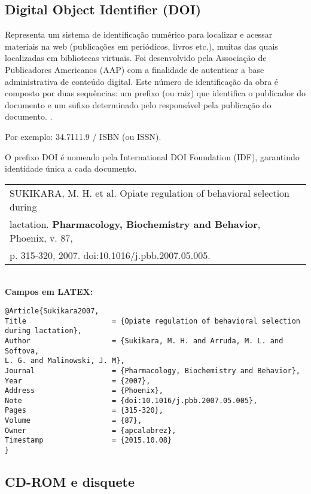 \subsection{Digital Object Identifier (DOI)}

Representa um sistema de identificação numérico para localizar e
acessar materiais na web (publicações em periódicos, livros etc.), muitas
das quais localizadas em bibliotecas virtuais. Foi desenvolvido pela
Associação de Publicadores Americanos (AAP) com a finalidade de autenticar a base administrativa de conteúdo digital. Este número de
identificação da obra é composto por duas sequências: um prefixo (ou
raiz) que identifica o publicador do documento e um sufixo determinado
pelo responsável pela publicação do documento. \cite{Doic2016}.

Por exemplo: 34.7111.9 / ISBN (ou ISSN).

O prefixo DOI é nomeado pela International DOI Foundation (IDF),
garantindo identidade única a cada documento. \\


\begin{tabular}{|l|c|} \hline
SUKIKARA, M. H. et al. Opiate regulation of behavioral selection during \\lactation. \textbf{Pharmacology, Biochemistry and Behavior}, Phoenix, v. 87,\\ p. 315-320, 2007. doi:10.1016/j.pbb.2007.05.005. 
	\\\hline
\end{tabular} \\

\textbf{Campos em LATEX:} 

\begin{verbatim}
@Article{Sukikara2007,
Title                    = {Opiate regulation of behavioral selection 
during lactation},
Author                   = {Sukikara, M. H. and Arruda, M. L. and 
Softova,
L. G. and Malinowski, J. M},
Journal                  = {Pharmacology, Biochemistry and Behavior},
Year                     = {2007},
Address                  = {Phoenix},
Note                     = {doi:10.1016/j.pbb.2007.05.005},
Pages                    = {315-320},
Volume                   = {87},
Owner                    = {apcalabrez},
Timestamp                = {2015.10.08}
}

\end{verbatim}

\subsection{CD-ROM e disquete}

